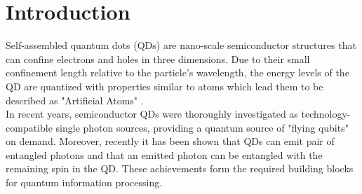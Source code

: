 \section{Introduction}
		Self-assembled quantum dots (QDs) are nano-scale semiconductor structures that can confine electrons and holes in three dimensions. Due to their small confinement length relative to the particle's wavelength, the energy levels of the QD are quantized with properties similar to atoms which lead them to be described as "Artificial Atoms" \cite{Kastner1993}. \\
  In recent years, semiconductor QDs were thoroughly investigated as technology-compatible single photon sources, providing a quantum source of "flying qubits" on demand.\cite{Dekel2000,Michler2000,Michler2000_1,Yuan2002} Moreover, recently it has been shown that QDs can emit pair of entangled photons \cite{Akopian2006,Hafenbrak2007} and that an emitted photon can be entangled with the remaining spin in the QD. \cite{Pelk2012,Schaibley2013,Gao2012} These achievements form the required building blocks for quantum information processing. \cite{DiVincenzo1998,Duan2001}
